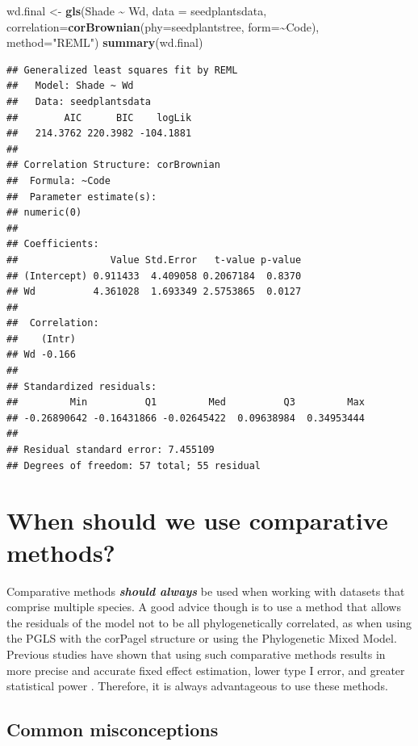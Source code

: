 \documentclass[
]{book}
\newenvironment{Shaded}{\begin{snugshade}}{\end{snugshade}}
\newcommand{\AttributeTok}[1]{\textcolor[rgb]{0.13,0.29,0.53}{#1}}
\newcommand{\FunctionTok}[1]{\textcolor[rgb]{0.13,0.29,0.53}{\textbf{#1}}}
\newcommand{\NormalTok}[1]{#1}
\newcommand{\OtherTok}[1]{\textcolor[rgb]{0.56,0.35,0.01}{#1}}
\newcommand{\SpecialCharTok}[1]{\textcolor[rgb]{0.81,0.36,0.00}{\textbf{#1}}}
\newcommand{\StringTok}[1]{\textcolor[rgb]{0.31,0.60,0.02}{#1}}
\begin{document}
\begin{Shaded}
\begin{Highlighting}[]
\NormalTok{wd.final }\OtherTok{\textless{}{-}} \FunctionTok{gls}\NormalTok{(Shade }\SpecialCharTok{\textasciitilde{}}\NormalTok{ Wd, }\AttributeTok{data =}\NormalTok{ seedplantsdata,}
                \AttributeTok{correlation=}\FunctionTok{corBrownian}\NormalTok{(}\AttributeTok{phy=}\NormalTok{seedplantstree, }\AttributeTok{form=}\SpecialCharTok{\textasciitilde{}}\NormalTok{Code), }
                \AttributeTok{method=}\StringTok{"REML"}\NormalTok{)}
\FunctionTok{summary}\NormalTok{(wd.final)}
\end{Highlighting}
\end{Shaded}

\begin{verbatim}
## Generalized least squares fit by REML
##   Model: Shade ~ Wd 
##   Data: seedplantsdata 
##        AIC      BIC    logLik
##   214.3762 220.3982 -104.1881
## 
## Correlation Structure: corBrownian
##  Formula: ~Code 
##  Parameter estimate(s):
## numeric(0)
## 
## Coefficients:
##                Value Std.Error   t-value p-value
## (Intercept) 0.911433  4.409058 0.2067184  0.8370
## Wd          4.361028  1.693349 2.5753865  0.0127
## 
##  Correlation: 
##    (Intr)
## Wd -0.166
## 
## Standardized residuals:
##         Min          Q1         Med          Q3         Max 
## -0.26890642 -0.16431866 -0.02645422  0.09638984  0.34953444 
## 
## Residual standard error: 7.455109 
## Degrees of freedom: 57 total; 55 residual
\end{verbatim}

\chapter{When should we use comparative methods?}\label{when-should-we-use-comparative-methods}

Comparative methods \textbf{\emph{should always}} be used when working with datasets that comprise multiple species. A good advice though is to use a method that allows the residuals of the model not to be all phylogenetically correlated, as when using the PGLS with the corPagel structure or using the Phylogenetic Mixed Model. Previous studies have shown that using such comparative methods results in more precise and accurate fixed effect estimation, lower type I error, and greater statistical power \citep{revell2010phylogenetic}. Therefore, it is always advantageous to use these methods.

\section{Common misconceptions}\label{common-misconceptions}
\end{document}
